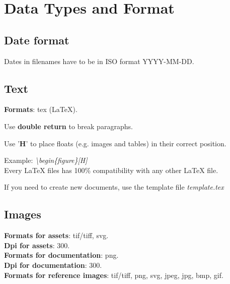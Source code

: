 \section{Data Types and Format}

\subsection{Date format}
Dates in filenames have to be in ISO format YYYY-MM-DD.

\subsection{Text}
\textbf{Formats}: tex (LaTeX).


Use \textbf{double return} to break paragraphs.

Use '\textbf{H}' to place floats (e.g. images and tables) in their correct position.

Example: \textit{\textbackslash{}begin\{figure\}[H]}\\

Every LaTeX files has 100\% compatibility with any other LaTeX file.

If you need to create new documents, use the template file \textit{template.tex}

\subsection{Images}
\textbf{Formats for assets}: tif/tiff, svg.\\
\textbf{Dpi for assets}: 300.\\

\textbf{Formats for documentation}: png.\\
\textbf{Dpi for documentation}: 300.\\

\textbf{Formats for reference images}: tif/tiff, png, svg, jpeg, jpg, bmp, gif.

